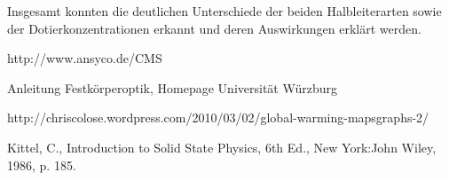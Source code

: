 \documentclass[paper=a4,fontsize=10pt,DIV=18,twocolumn,parskip=half]{scrartcl}
\numberwithin{equation}{section}    %
\begin{document}
Insgesamt konnten die deutlichen Unterschiede der beiden Halbleiterarten sowie der Dotierkonzentrationen erkannt und deren Auswirkungen erklärt werden.
\begin{thebibliography}{}   

 http://www.ansyco.de/CMS

Anleitung Festkörperoptik, Homepage Universität Würzburg

http://chriscolose.wordpress.com/2010/03/02/global-warming-mapsgraphs-2/

 Kittel, C., Introduction to Solid State Physics, 6th Ed., New York:John Wiley, 1986, p. 185. 

\end{thebibliography}
\end{document}
